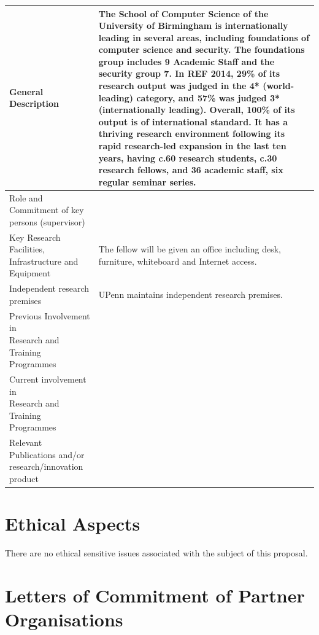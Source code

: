 \documentclass{article}[11pt]
\begin{document}
{\begin{tabular}{| l | l |}
    \hline
    \parbox[c]{4cm}{General Description} & 
    \parbox[c]{14cm}{The School of Computer Science of the University of Birmingham is internationally
      leading in several areas, including foundations of computer science and security. The foundations group includes 9
      Academic Staff and the security group 7. In REF 2014, 29\% of its research output was judged in the 4* (world-leading)
      category, and 57\% was judged 3* (internationally leading). Overall, 100\% of its output is of international standard.
      It has a thriving research environment following its rapid research-led expansion in the last ten years, having c.60
      research students, c.30 research fellows, and 36 academic staff, six regular seminar series.
    } \\
    \hline
    \parbox[c]{4cm}{Role and Commitment of key persons (supervisor)} & \parbox[c]{14cm}{} \\
    \hline
    \parbox[c]{4cm}{Key  Research  Facilities,   Infrastructure and Equipment} & \parbox[c]{14cm}{The fellow will be given an office including desk, furniture, whiteboard and Internet access.} \\
    \hline
    \parbox[c]{4cm}{Independent research premises} &  \parbox[c]{14cm}{UPenn maintains independent research premises.}\\
    \hline
    \parbox[c]{4cm}{Previous Involvement in\\ Research and Training\\ Programmes} & \parbox[c]{14cm}{} \\
    \hline
    \parbox[c]{4cm}{Current  involvement  in\\  Research and Training\\ Programmes} & \parbox[c]{14cm}{} \\
    \hline
    \parbox[c]{4cm}{Relevant  Publications  and/or\\  research/innovation product} & \parbox[c]{14cm}{} \\
    \hline
  \end{tabular}

}

\section{Ethical Aspects}

There are no ethical sensitive issues associated with the subject of this proposal.


\section{Letters of Commitment of Partner Organisations}


\label{LastPage}
\end{document}
